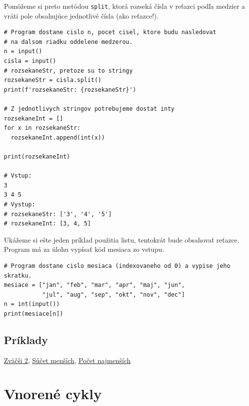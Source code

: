 \documentclass{article}
\begin{document}
Pomôžeme si preto metódou \texttt{split}, ktorá rozseká čísla v reťazci podľa medzier a vráti pole obsahujúce jednotlivé čísla (ako reťazce!).
\begin{lstlisting}
# Program dostane cislo n, pocet cisel, ktore budu nasledovat
# na dalsom riadku oddelene medzerou.
n = input()
cisla = input()
# rozsekaneStr, pretoze su to stringy
rozsekaneStr = cisla.split()
print(f'rozsekaneStr: {rozsekaneStr}')

# Z jednotlivych stringov potrebujeme dostat inty
rozsekaneInt = []
for x in rozsekaneStr:
  rozsekaneInt.append(int(x))
  
print(rozsekaneInt)

# Vstup:
3 
3 4 5
# Vystup:
# rozsekaneStr: ['3', '4', '5']
# rozsekaneInt: [3, 4, 5]
\end{lstlisting}

Ukážeme si ešte jeden príklad použitia listu, tentokrát bude obsahovať reťazce. Program má za úlohu vypísať kód mesiaca zo vstupu.
\begin{lstlisting}
# Program dostane cislo mesiaca (indexovaneho od 0) a vypise jeho skratku.
mesiace = ["jan", "feb", "mar", "apr", "maj", "jun",
           "jul", "aug", "sep", "okt", "nov", "dec"]
n = int(input())
print(mesiace[n])
\end{lstlisting}

\subsection{Príklady}
\href{https://testovac.ksp.sk/tasks/ls-uvod-zvacsi2/}{Zväčši 2},
\href{https://testovac.ksp.sk/tasks/ls-uvod-sucetmensich/}{Súčet menších},
\href{https://testovac.ksp.sk/tasks/ls-uvod-pocetnajmensich/}{Počet najmenších}

\section{Vnorené cykly}
\end{document}

